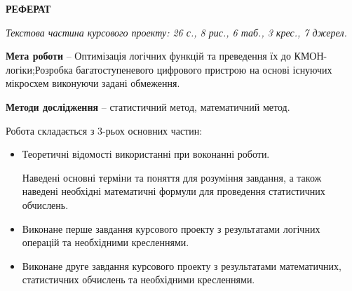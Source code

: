 \begin{center}
\textbf{РЕФЕРАТ}
\end{center}
\emph{Текстова частина курсового проекту:  26 с., 8 рис., 6 таб., 3 крес., 7 джерел.}

\textbf{Мета роботи} – Оптимізація логічних функцій та преведення їх до КМОН-логіки;Розробка багатоступеневого цифрового пристрою на основі існуючих мікросхем виконуючи задані обмеження.

\textbf{Методи дослідження} – статистичний метод, математичний метод.

Робота складається з 3-рьох основних частин:

\begin{itemize}
\item Теоретичні відомості використанні при воконанні роботи.

Наведені основні терміни та поняття для розуміння завдання, а також наведені необхідні математичні формули для проведення статистичних обчислень.
\item Виконане перше завдання курсового проекту з результатами логічних операцій та необхідними кресленнями.
\item Виконане друге завдання курсового проекту з результатами математичних, статистичних обчислень та необхідними кресленнями.
\end{itemize}